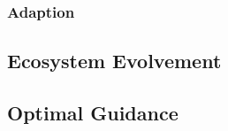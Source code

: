 \subsubsection{Adaption}

\subsection{Ecosystem Evolvement} %
\label{sub:ecosystem_evolvement}


\subsection{Optimal Guidance} %
\label{sub:optimal_guidance}

